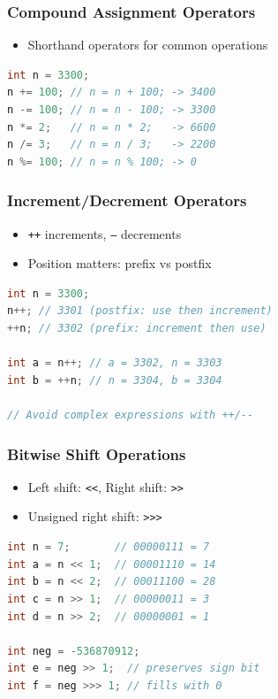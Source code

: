\documentclass[serif, aspectratio=169]{beamer}
\begin{document}
\begin{frame}[fragile]
\frametitle{Compound Assignment Operators}
\begin{itemize}
    \item Shorthand operators for common operations
\end{itemize}
\begin{lstlisting}[language=Java]
int n = 3300;
n += 100; // n = n + 100; -> 3400
n -= 100; // n = n - 100; -> 3300
n *= 2;   // n = n * 2;   -> 6600
n /= 3;   // n = n / 3;   -> 2200
n %= 100; // n = n % 100; -> 0
\end{lstlisting}
\end{frame}

\begin{frame}[fragile]
\frametitle{Increment/Decrement Operators}
\begin{itemize}
    \item \texttt{++} increments, \texttt{--} decrements
    \item Position matters: prefix vs postfix
\end{itemize}
\begin{lstlisting}[language=Java]
int n = 3300;
n++; // 3301 (postfix: use then increment)
++n; // 3302 (prefix: increment then use)

int a = n++; // a = 3302, n = 3303
int b = ++n; // n = 3304, b = 3304

// Avoid complex expressions with ++/--
\end{lstlisting}
\end{frame}

\begin{frame}[fragile]
\frametitle{Bitwise Shift Operations}
\begin{itemize}
    \item Left shift: \texttt{\textless{}\textless{}}, Right shift: \texttt{\textgreater{}\textgreater{}}
    \item Unsigned right shift: \texttt{\textgreater{}\textgreater{}\textgreater{}}
\end{itemize}
\begin{lstlisting}[language=Java]
int n = 7;       // 00000111 = 7
int a = n << 1;  // 00001110 = 14
int b = n << 2;  // 00011100 = 28
int c = n >> 1;  // 00000011 = 3
int d = n >> 2;  // 00000001 = 1

int neg = -536870912;
int e = neg >> 1;  // preserves sign bit
int f = neg >>> 1; // fills with 0
\end{lstlisting}
\end{frame}
\end{document}
